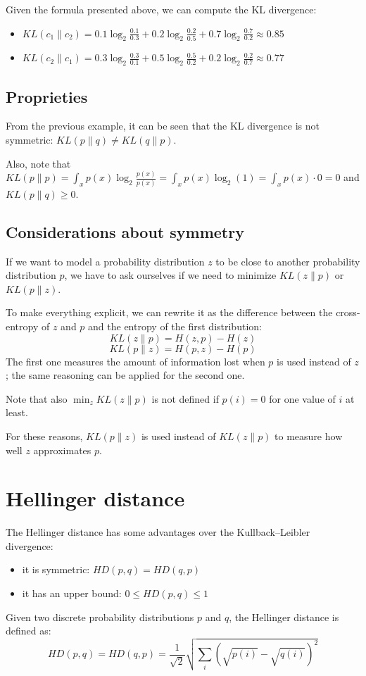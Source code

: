Given the formula presented above, we can compute the KL divergence:
\begin{itemize}
    \item $\mathit{KL}(c_1 \| c_2) = 0.1 \log_2 \frac{0.1}{0.3} + 0.2 \log_2 \frac{0.2}{0.5} + 0.7 \log_2 \frac{0.7}{0.2} \approx 0.85$
    \item $\mathit{KL}(c_2 \| c_1) = 0.3 \log_2 \frac{0.3}{0.1} + 0.5 \log_2 \frac{0.5}{0.2} + 0.2 \log_2 \frac{0.2}{0.7} \approx 0.77$
\end{itemize}


\subsection{Proprieties}
From the previous example, it can be seen that the KL divergence is not symmetric: $\mathit{KL}(p \| q) \neq \mathit{KL}(q \| p)$.

Also, note that $\mathit{KL}(p \| p) = \int_x p(x) \log_2 \frac{p(x)}{p(x)} = \int_x p(x) \log_2 (1) = \int_x p(x) \cdot 0 = 0$
and $\mathit{KL}(p \| q) \geq 0$.

\subsection{Considerations about symmetry}

If we want to model a probability distribution $z$ to be close to another probability distribution $p$, we have to ask ourselves if we need to minimize $\mathit{KL}(z \| p)$ or $\mathit{KL}(p \| z)$.

To make everything explicit, we can rewrite it as the difference between the cross-entropy of $z$ and $p$ and the entropy of the first distribution:
$$ \mathit{KL}(z \| p) = H(z, p) - H(z)$$
$$ \mathit{KL}(p \| z) = H(p, z) - H(p)$$
The first one measures the amount of information lost when $p$ is used instead of $z$; the same reasoning can be applied for the second one.

Note that also $\min_{z} \mathit{KL}(z \| p)$ is not defined if $p(i)=0$ for one value of $i$ at least.

For these reasons, $\mathit{KL}(p \| z)$ is used instead of $\mathit{KL}(z \| p)$ to measure how well $z$ approximates $p$.

\section{Hellinger distance}
The Hellinger distance has some advantages over the Kullback–Leibler divergence:
\begin{itemize}
    \item it is symmetric: $\mathit{HD}(p, q) = \mathit{HD}(q, p)$
    \item it has an upper bound: $0 \leq \mathit{HD}(p, q) \leq 1$
\end{itemize}

Given two discrete probability distributions $p$ and $q$, the Hellinger distance is defined as:
$$\mathit{HD}(p, q) = \mathit{HD}(q, p) = \frac{1}{\sqrt{2}} \sqrt{\sum_i (\sqrt{p(i)} - \sqrt{q(i)})^2}$$